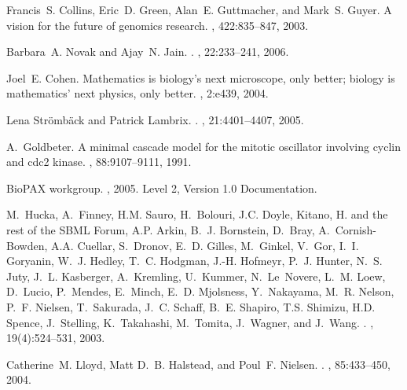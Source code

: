 \documentclass[a4paper,10pt,titlepage]{article}
\begin{document}
\begin{thebibliography}{10}

Francis~S. Collins, Eric~D. Green, Alan~E. Guttmacher, and Mark~S. Guyer.
\newblock A vision for the future of genomics research.
, 422:835--847, 2003.

Barbara~A. Novak and Ajay~N. Jain.
.
, 22:233--241, 2006.

Joel~E. Cohen.
\newblock Mathematics is biology's next microscope, only better; biology is
  mathematics' next physics, only better.
, 2:e439, 2004.

Lena Str\"omb\"ack and Patrick Lambrix.
.
, 21:4401--4407, 2005.

A.~Goldbeter.
\newblock A minimal cascade model for the mitotic oscillator involving cyclin
  and cdc2 kinase.
,
  88:9107--9111, 1991.

{BioPAX workgroup}.
, 2005.
\newblock Level 2, Version 1.0 Documentation.

M.~Hucka, A.~Finney, H.M. Sauro, H.~Bolouri, J.C. Doyle, {Kitano, H. and the
  rest of the SBML Forum}, A.P. Arkin, B.~J. Bornstein, D.~Bray,
  A.~Cornish-Bowden, A.A. Cuellar, S.~Dronov, E.~D. Gilles, M.~Ginkel, V.~Gor,
  I.~I. Goryanin, W.~J. Hedley, T.~C. Hodgman, J.-H. Hofmeyr, P.~J. Hunter,
  N.~S. Juty, J.~L. Kasberger, A.~Kremling, U.~Kummer, N.~Le~Novere, L.~M.
  Loew, D.~Lucio, P.~Mendes, E.~Minch, E.~D. Mjolsness, Y.~Nakayama, M.~R.
  Nelson, P.~F. Nielsen, T.~Sakurada, J.~C. Schaff, B.~E. Shapiro, T.S.
  Shimizu, H.D. Spence, J.~Stelling, K.~Takahashi, M.~Tomita, J.~Wagner, and
  J.~Wang.
.
, 19(4):524--531, 2003.

Catherine~M. Lloyd, Matt D.~B. Halstead, and Poul~F. Nielsen.
.
, 85:433--450,
  2004.


\end{thebibliography}
\end{document}
